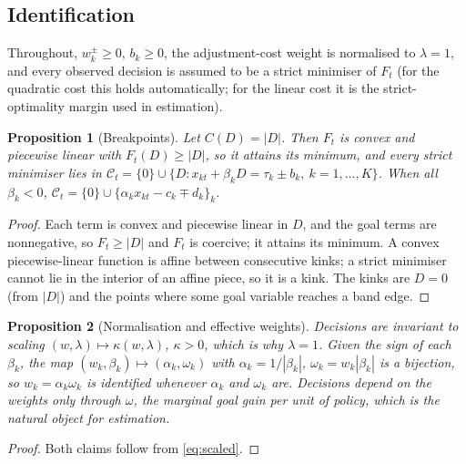 \documentclass[11pt,a4paper]{article}
\newtheorem{proposition}{Proposition}
\theoremstyle{remark}\newtheorem{remark}{Remark}
\begin{document}
\subsection{Identification}\label{sec:ident}
Throughout, $w_k^\pm\ge0$, $b_k\ge0$, the adjustment-cost weight is normalised to $\lambda=1$, and every observed decision is assumed to be a strict minimiser of $F_t$ (for the quadratic cost this holds automatically; for the linear cost it is the strict-optimality margin used in estimation).

\begin{proposition}[Breakpoints]\label{prop:bp}
Let $C(D)=|D|$. Then $F_t$ is convex and piecewise linear with $F_t(D)\ge|D|$, so it attains its minimum, and every strict minimiser lies in $\mathcal{C}_t=\{0\}\cup\{D: x_{kt}+\beta_kD=\tau_k\pm b_k,\ k=1,\dots,K\}$. When all $\beta_k<0$, $\mathcal{C}_t=\{0\}\cup\{\alpha_kx_{kt}-c_k\mp d_k\}_k$.
\end{proposition}
\begin{proof}
Each term is convex and piecewise linear in $D$, and the goal terms are nonnegative, so $F_t\ge|D|$ and $F_t$ is coercive; it attains its minimum. A convex piecewise-linear function is affine between consecutive kinks; a strict minimiser cannot lie in the interior of an affine piece, so it is a kink. The kinks are $D=0$ (from $|D|$) and the points where some goal variable reaches a band edge.
\end{proof}

\begin{proposition}[Normalisation and effective weights]\label{prop:eff}
Decisions are invariant to scaling $(w,\lambda)\mapsto\kappa(w,\lambda)$, $\kappa>0$, which is why $\lambda=1$. Given the sign of each $\beta_k$, the map $(w_k,\beta_k)\mapsto(\alpha_k,\omega_k)$ with $\alpha_k=1/|\beta_k|$, $\omega_k=w_k|\beta_k|$ is a bijection, so $w_k=\alpha_k\omega_k$ is identified whenever $\alpha_k$ and $\omega_k$ are. Decisions depend on the weights only through $\omega$, the marginal goal gain per unit of policy, which is the natural object for estimation.
\end{proposition}
\begin{proof}
Both claims follow from \eqref{eq:scaled}.
\end{proof}
\end{document}
